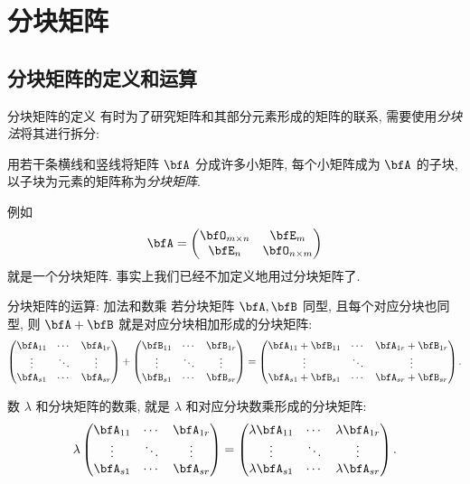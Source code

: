 \section{分块矩阵}

\subsection{分块矩阵的定义和运算}

\begin{frame}{分块矩阵的定义}
	\onslide<+->
	有时为了研究矩阵和其部分元素形成的矩阵的联系, 需要使用\emph{分块法}将其进行拆分:
	\onslide<+->
	\begin{definition}
		用若干条横线和竖线将矩阵 $\bfA$ 分成许多小矩阵, 每个小矩阵成为 $\bfA$ 的子块, 以子块为元素的矩阵称为\emph{分块矩阵}.
	\end{definition}
	\onslide<+->
	例如
	\[\bfA=\begin{pmatrix}
		\bfO_{m\times n}&\bfE_m\\
		\bfE_n&\bfO_{n\times m}
	\end{pmatrix}\]
	就是一个分块矩阵.
	\onslide<+->
	事实上我们已经不加定义地用过分块矩阵了.
\end{frame}


\begin{frame}{分块矩阵的运算: 加法和数乘}
	\onslide<+->
	若分块矩阵 $\bfA,\bfB$ 同型, 且每个对应分块也同型, 则 $\bfA+\bfB$ 就是对应分块相加形成的分块矩阵:
	\[\begin{pmatrix}
		\bfA_{11}&\cdots&\bfA_{1r}\\
		\vdots&\ddots&\vdots\\
		\bfA_{s1}&\cdots&\bfA_{sr}
	\end{pmatrix}+\begin{pmatrix}
		\bfB_{11}&\cdots&\bfB_{1r}\\
		\vdots&\ddots&\vdots\\
		\bfB_{s1}&\cdots&\bfB_{sr}
	\end{pmatrix}=\begin{pmatrix}
		\bfA_{11}+\bfB_{11}&\cdots&\bfA_{1r}+\bfB_{1r}\\
		\vdots&\ddots&\vdots\\
		\bfA_{s1}+\bfB_{s1}&\cdots&\bfA_{sr}+\bfB_{sr}
	\end{pmatrix}.\]

	\onslide<+->
	数 $\lambda$ 和分块矩阵的数乘, 就是 $\lambda$ 和对应分块数乘形成的分块矩阵:
	\[\lambda\begin{pmatrix}
		\bfA_{11}&\cdots&\bfA_{1r}\\
		\vdots&\ddots&\vdots\\
		\bfA_{s1}&\cdots&\bfA_{sr}
	\end{pmatrix}=\begin{pmatrix}
		\lambda\bfA_{11}&\cdots&\lambda\bfA_{1r}\\
		\vdots&\ddots&\vdots\\
		\lambda\bfA_{s1}&\cdots&\lambda\bfA_{sr}
	\end{pmatrix}.\]
\end{frame}


